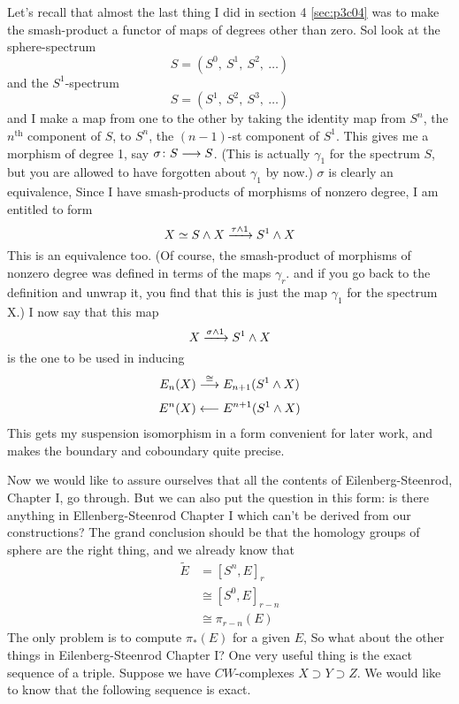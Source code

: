 \documentclass[../main]{subfiles}
\begin{document}
\begin{enumerate}
    Let's recall that almost the last thing I did in section 4 \ref{sec:p3c04} was to make the smash-product a functor of maps of degrees other than zero. Sol look at the sphere-spectrum
    \[S=(S^0, \:S^1, \:S^2, \:\dots)\]
    and the $S^1$-spectrum
    \[S=(S^1, \:S^2, \:S^3, \:\dots)\]
    and I make a map from one to the other by taking the identity map from $S^n$, the $n^\text{th}$ component of $S$, to $S^n$, the $(n-1)$-st component of $S^1$. This gives me a morphism of degree 1, say $\sigma\colon S\longrightarrow S$. (This is actually $\gamma_1$ for the spectrum $S$, but you are allowed to have forgotten about $\gamma_1$ by now.) $\sigma$ is clearly an equivalence, Since I have smash-products of morphisms of nonzero degree, I am entitled to form
    \[X\simeq S\wedge X \vra{\tau\wedge 1} S^1\wedge X\]
    This is an equivalence too. (Of course, the smash-product of morphisms of nonzero degree was defined in terms of the maps $\gamma_r$. and if you go back to the definition and unwrap it, you find that this is just the map $\gamma_1$ for the spectrum X.) I now say that this map
    \[X\vra{\sigma\wedge 1}S^1\wedge X\]
    is the one to be used in inducing
    \begin{align}
        E_n(X) &\vra{\cong}E_{n+1}(S^1\wedge X) \nonumber \\
        E^n(X) &\longleftarrow E^{n+1}(S^1\wedge X) \nonumber
    \end{align}
    This gets my suspension isomorphism in a form convenient for later work, and makes the boundary and coboundary quite precise.
\end{enumerate}
Now we would like to assure ourselves that all the contents of Eilenberg-Steenrod, Chapter I, go through. But we can also put the question in this form: is there anything in Ellenberg-Steenrod Chapter I which can't be derived from our constructions? The grand conclusion should be that the homology groups of sphere are the right thing, and we already know that
\begin{align}
    \widetilde{E} &= [S^n, E]_r \nonumber \\
    &\cong [S^0, E]_{r-n} \nonumber \\
    &\cong \pi_{r-n}(E) \nonumber
\end{align}
The only problem is to compute $\pi_\ast(E)$ for a given $E$, So what about the other things in Eilenberg-Steenrod Chapter I? One very useful thing is the exact sequence of a triple. Suppose we have $CW$-complexes $X\supset Y\supset Z$. We would like to know that the following sequence is exact.
\end{document}

